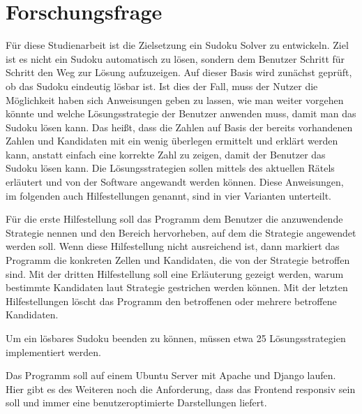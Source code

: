 \section{Forschungsfrage}

Für diese Studienarbeit ist die Zielsetzung ein Sudoku Solver zu entwickeln. Ziel ist es nicht ein Sudoku automatisch zu lösen, sondern dem Benutzer Schritt für Schritt den Weg zur Lösung aufzuzeigen. Auf dieser Basis wird zunächst geprüft, ob das Sudoku eindeutig lösbar ist. Ist dies der Fall, muss der Nutzer die Möglichkeit haben sich Anweisungen geben zu lassen, wie man weiter vorgehen könnte und welche Lösungsstrategie der Benutzer anwenden muss, damit man das Sudoku lösen kann. Das heißt, dass die Zahlen auf Basis der bereits vorhandenen Zahlen und Kandidaten mit ein wenig überlegen ermittelt und erklärt werden kann, anstatt einfach eine korrekte Zahl zu zeigen, damit der Benutzer das Sudoku lösen kann. Die Lösungsstrategien sollen mittels des aktuellen Rätels erläutert und von der Software angewandt werden können. Diese Anweisungen, im folgenden auch Hilfestellungen genannt, sind in vier Varianten unterteilt.

Für die erste Hilfestellung soll das Programm dem Benutzer die anzuwendende Strategie nennen und den Bereich hervorheben, auf dem die Strategie angewendet werden soll. Wenn diese Hilfestellung nicht ausreichend ist, dann markiert das Programm die konkreten Zellen und Kandidaten, die von der Strategie betroffen sind. Mit der dritten Hilfestellung soll eine Erläuterung gezeigt werden, warum bestimmte Kandidaten laut Strategie gestrichen werden können. Mit der letzten Hilfestellungen löscht das Programm den betroffenen oder mehrere betroffene Kandidaten.

Um ein lösbares Sudoku beenden zu können, müssen etwa 25 Lösungsstrategien implementiert werden.

Das Programm soll auf einem Ubuntu Server mit Apache und Django laufen. Hier gibt es des Weiteren noch die Anforderung, dass das Frontend responsiv sein soll und immer eine benutzeroptimierte Darstellungen liefert.